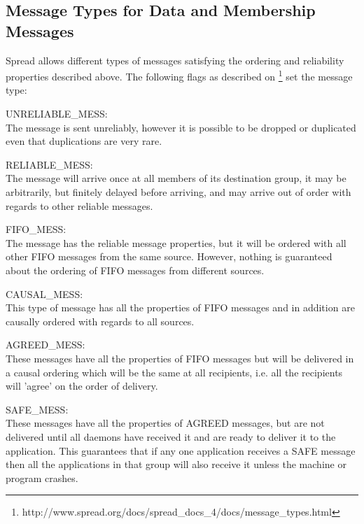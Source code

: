 \subsection{Message Types for Data and Membership Messages}

Spread allows different types of messages satisfying the ordering and reliability properties described above. The following flags as described on \footnote{http://www.spread.org/docs/spread\_docs\_4/docs/message\_types.html} set the message type: 

\begin{description}
	
	\item UNRELIABLE\_MESS:\\
	The message is sent unreliably, however it is possible to be dropped or duplicated even that duplications are very rare. 
	
	\item RELIABLE\_MESS:\\
	The message will arrive once at all members of its destination group, it may be arbitrarily, but finitely delayed before arriving, and may arrive out of order with regards to other reliable messages.
	
	\item FIFO\_MESS:\\
	The message has the reliable message properties, but it will be ordered with all other FIFO messages from the same source. However, nothing is guaranteed about the ordering of FIFO messages from different sources.
	
	\item CAUSAL\_MESS:\\
	This type of message has all the properties of FIFO messages and in addition are causally ordered with regards to all sources.
	
	\item AGREED\_MESS:\\
	These messages have all the properties of FIFO messages but will be delivered in a causal ordering which will be the same at all recipients, i.e. all the recipients will 'agree' on the order of delivery.
	
	\item SAFE\_MESS:\\
	These messages have all the properties of AGREED messages, but are not delivered until all daemons have received it and are ready to deliver it to the application. This guarantees that if any one application receives a SAFE message then all the applications in that group will also receive it unless the machine or program crashes.
		
\end{description}

